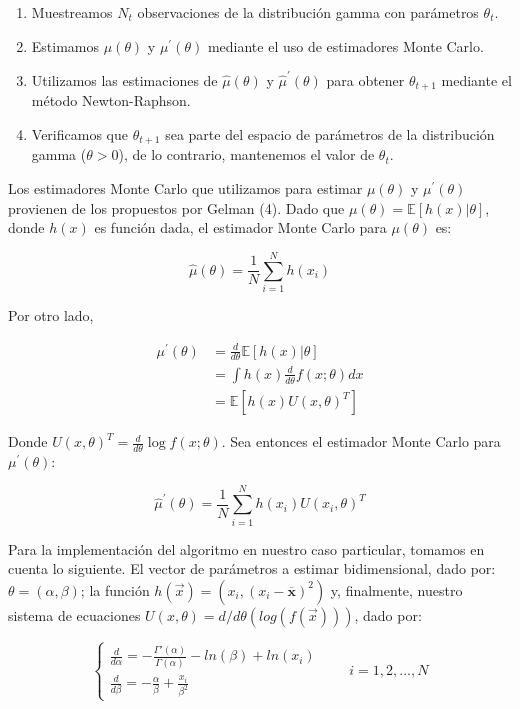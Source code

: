 \documentclass[9pt,twocolumn,twoside,]{pnas-new}
\begin{document}
\begin{enumerate}
    \item Muestreamos $N_{t}$ observaciones de la distribución gamma con parámetros $\theta_{t}$. 
    \item Estimamos $\mu(\theta)$ y $\mu^{\prime}(\theta)$ mediante el uso de estimadores Monte Carlo.
    \item Utilizamos las estimaciones de $\hat{\mu}(\theta)$ y $\hat{\mu}^{\prime}(\theta)$ para obtener $\theta_{t+1}$ mediante el método Newton-Raphson.
    \item Verificamos que $\theta_{t+1}$ sea parte del espacio de parámetros de la distribución gamma ($\theta > 0$), de lo contrario, mantenemos el valor de $\theta_{t}$.
\end{enumerate}

Los estimadores Monte Carlo que utilizamos para estimar \(\mu(\theta)\)
y \(\mu^{\prime}(\theta)\) provienen de los propuestos por Gelman (4).
Dado que \(\mu(\theta) = \mathbb{E}[h(x)|\theta]\), donde \(h(x)\) es
función dada, el estimador Monte Carlo para \(\mu(\theta)\) es:

\[\hat{\mu}(\theta) = \frac{1}{N} \sum_{i = 1}^{N} h(x_{i})\]

Por otro lado,

\begin{align*}
\mu^{\prime}(\theta) &= \frac{d}{d\theta}\mathbb{E}[h(x)|\theta] \\
&= \int h(x) \frac{d}{d\theta} f(x;\theta) dx \\
&= \mathbb{E}[h(x)U(x,\theta)^{T}]
\end{align*}

Donde \(U(x,\theta)^{T} = \frac{d}{d\theta} \log{f(x;\theta)}\). Sea
entonces el estimador Monte Carlo para \(\mu^{\prime}(\theta)\):

\[\hat{\mu}^{\prime}(\theta) = \frac{1}{N} \sum_{i = 1}^{N} h(x_{i})U(x_{i},\theta)^{T}\]

Para la implementación del algoritmo en nuestro caso particular, tomamos
en cuenta lo siguiente. El vector de parámetros a estimar bidimensional,
dado por: \(\theta=(\alpha,\beta)\); la función
\(h(\vec{x})=(x_i, (x_i - \overline{\mathbf{x}})^{2})\) y, finalmente,
nuestro sistema de ecuaciones
\(U(x,\theta)= d / d \theta (log(f(\vec{x})))\), dado por:

\[ \begin{cases} \frac{\displaystyle d}{\displaystyle d\alpha}=-\frac{\displaystyle \Gamma'(\alpha)}{\displaystyle \Gamma(\alpha)}-ln(\beta)+ln(x_i) \\ \frac{\displaystyle d}{\displaystyle d\beta}= -\frac{\displaystyle \alpha}{\displaystyle \beta} + \frac{\displaystyle x_i}{\displaystyle \beta^{2}}  \end{cases} \qquad i=1,2,...,N \]
\end{document}

